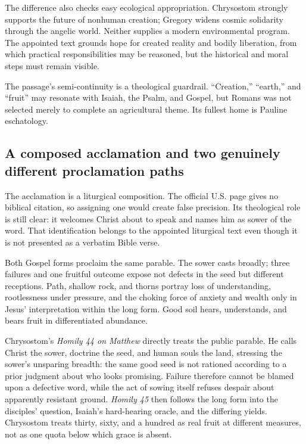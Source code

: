 \begin{deepstudy}
The difference also checks easy ecological appropriation. Chrysostom strongly supports the future of nonhuman creation; Gregory widens cosmic solidarity through the angelic world. Neither supplies a modern environmental program. The appointed text grounds hope for created reality and bodily liberation, from which practical responsibilities may be reasoned, but the historical and moral steps must remain visible.

The passage's semi-continuity is a theological guardrail. “Creation,” “earth,” and “fruit” may resonate with Isaiah, the Psalm, and Gospel, but Romans was not selected merely to complete an agricultural theme. Its fullest home is Pauline eschatology.

\subsection*{A composed acclamation and two genuinely different proclamation paths\enspace{}}

The acclamation is a liturgical composition. The official U.S. page gives no biblical citation, so assigning one would create false precision. Its theological role is still clear: it welcomes Christ about to speak and names him as sower of the word. That identification belongs to the appointed liturgical text even though it is not presented as a verbatim Bible verse.

Both Gospel forms proclaim the same parable. The sower casts broadly; three failures and one fruitful outcome expose not defects in the seed but different receptions. Path, shallow rock, and thorns portray loss of understanding, rootlessness under pressure, and the choking force of anxiety and wealth only in Jesus' interpretation within the long form. Good soil hears, understands, and bears fruit in differentiated abundance.

Chrysostom's \emph{Homily 44 on Matthew} directly treats the public parable. He calls Christ the sower, doctrine the seed, and human souls the land, stressing the sower's unsparing breadth: the same good seed is not rationed according to a prior judgment about who looks promising. Failure therefore cannot be blamed upon a defective word, while the act of sowing itself refuses despair about apparently resistant ground. \emph{Homily 45} then follows the long form into the disciples' question, Isaiah's hard-hearing oracle, and the differing yields. Chrysostom treats thirty, sixty, and a hundred as real fruit at different measures, not as one quota below which grace is absent.


\end{deepstudy}
